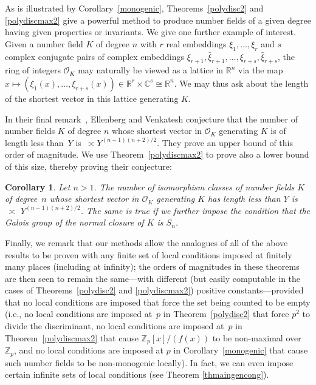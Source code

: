 \documentclass[11pt]{article}
\def\Z{{\mathbb Z}}
\def\OO{{\mathcal O}}
\def\R{{\mathbb R}}
\def\C{{\mathcal C}}
\def\Z{{\mathbb Z}}
\def\C{{\mathbb C}}
\newtheorem{corollary}[theorem]{Corollary}
\begin{document}
As is illustrated by Corollary~\ref{monogenic},
Theorems~\ref{polydisc2} and \ref{polydiscmax2} give a powerful method
to produce number fields of a given degree having given properties or
invariants.  We give one further example of interest.  Given a number
field $K$ of degree $n$ with $r$ real embeddings $\xi_1,\dots,\xi_r$
and $s$ complex conjugate pairs of complex embeddings
$\xi_{r+1},\bar\xi_{r+1},\ldots,\xi_{r+s},\bar\xi_{r+s}$, the ring of
integers $\mathcal O_K$ may naturally be viewed as a lattice in $\R^n$
via the map $x\mapsto (\xi_1(x),\ldots,\xi_{r+s}(x))\in
\R^r\times\C^s\cong \R^n$.  We may thus ask about the length of the
shortest vector in this lattice generating $K$.

In their final remark~\cite[Remark~3.3]{EV}, Ellenberg and Venkatesh
conjecture that the number of number fields $K$ of degree $n$ whose
shortest vector in $\OO_K$ generating $K$ is of length less than~$Y$
is $\,\asymp Y^{(n-1)(n+2)/2}$. They prove an upper bound of this
order of magnitude.  We use Theorem~\ref{polydiscmax2} to prove also a
lower bound of this size, thereby proving their conjecture:

\begin{corollary}\label{shortvector}
Let $n>1$.  The number of isomorphism classes of number fields $K$ of
degree~$n$ whose shortest vector in
$\OO_K$ generating $K$ has length less than $Y$ is $\,\asymp$
$Y^{(n-1)(n+2)/2}$.  The same is true if we further impose the
condition that the Galois group of the normal closure of $K$ is $S_n$.
\end{corollary}


Finally, we remark that our methods allow the analogues of all of the
above results to be proven with any finite set of local conditions
imposed at finitely many places (including at infinity); the orders of
magnitudes in these theorems are then seen to remain the same---with
different (but easily computable in the cases of
Theorems~\ref{polydisc2} and \ref{polydiscmax2}) positive
constants---provided that no local conditions are imposed that force
the set being counted to be empty (i.e., no local conditions are
imposed at~$p$ in Theorem~\ref{polydisc2} that force $p^2$ to divide
the discriminant, no local conditions are imposed at~$p$ in
Theorem~\ref{polydiscmax2} that cause $\Z_p[x]/(f(x))$ to be
non-maximal over~$\Z_p$, and no local conditions are imposed at $p$ in
Corollary~\ref{monogenic} that cause such number fields to be
non-monogenic locally). In fact, we can even impose certain infinite
sets of local conditions (see Theorem \ref{thmaingencong}).
\end{document}
